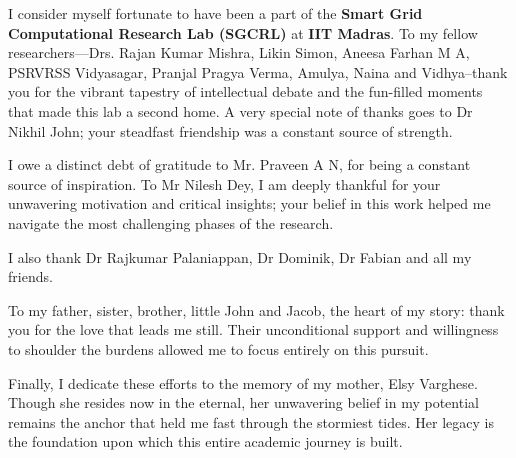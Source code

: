 \vspace{1em}

\noindent I consider myself fortunate to have been a part of the \textbf{Smart Grid Computational Research Lab (SGCRL)} at \textbf{IIT Madras}. To my fellow researchers---Drs. Rajan Kumar Mishra, Likin Simon, Aneesa Farhan M A, PSRVRSS Vidyasagar, Pranjal Pragya Verma, Amulya, Naina and Vidhya--thank you for the vibrant tapestry of intellectual debate and the fun-filled moments that made this lab a second home. A very special note of thanks goes to Dr Nikhil John; your steadfast friendship was a constant source of strength.

\vspace{1em}



\vspace{1em}

\noindent I owe a distinct debt of gratitude to Mr. Praveen A N, for being a constant source of inspiration. To Mr Nilesh Dey, I am deeply thankful for your unwavering motivation and critical insights; your belief in this work helped me navigate the most challenging phases of the research.

\vspace{1em}

\noindent I also thank Dr Rajkumar Palaniappan, Dr Dominik, Dr Fabian and all my friends.

\vspace{1em}

\noindent To my father, sister, brother, little John and Jacob, the heart of my story: thank you for the love that leads me still. Their unconditional support and willingness to shoulder the burdens allowed me to focus entirely on this pursuit.


\noindent Finally, I dedicate these efforts to the memory of my mother, Elsy Varghese. Though she resides now in the eternal, her unwavering belief in my potential remains the anchor that held me fast through the stormiest tides. Her legacy is the foundation upon which this entire academic journey is built.

\newpage

    

    